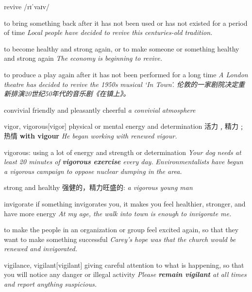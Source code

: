 \begin{DefWord}{revive}
    /rɪˈvaɪv/

    to bring something back after it has not been used or has not existed for a period of time
    \textit{Local people have decided to revive this centuries-old tradition.}

    to become healthy and strong again, or to make someone or something healthy and strong again
    \textit{The economy is beginning to revive.}

    to produce a play again after it has not been performed for a long time
    \textit{A London theatre has decided to revive the 1950s musical ‘In Town’. 伦敦的一家剧院决定重新排演20世纪50年代的音乐剧《在镇上》。}
\end{DefWord}

\begin{DefWord}{convivial}
    friendly and pleasantly cheerful
    \textit{a convivial atmosphere}
\end{DefWord}

\begin{DefWord}{vigor, vigorous}[vigor]
    physical or mental energy and determination 活力﹐精力﹔热情
    \textbf{with vigour}
    \textit{He began working with renewed vigour.}

    vigorous: using a lot of energy and strength or determination
    \textit{Your dog needs at least 20 minutes of \textbf{vigorous exercise} every day.}
    \textit{Environmentalists have begun a vigorous campaign to oppose nuclear dumping in the area.}

    strong and healthy 强健的，精力旺盛的:
    \textit{a vigorous young man}
\end{DefWord}

\begin{DefWord}{invigorate}
    if something invigorates you, it makes you feel healthier, stronger, and have more energy
    \textit{At my age, the walk into town is enough to invigorate me.}

    to make the people in an organization or group feel excited again, so that they want to make something successful
    \textit{Carey’s hope was that the church would be renewed and invigorated.}
\end{DefWord}

\begin{DefWord}{vigilance, vigilant}[vigilant]
    giving careful attention to what is happening, so that you will notice any danger or illegal activity
    \textit{Please \textbf{remain vigilant} at all times and report anything suspicious.}
\end{DefWord}

